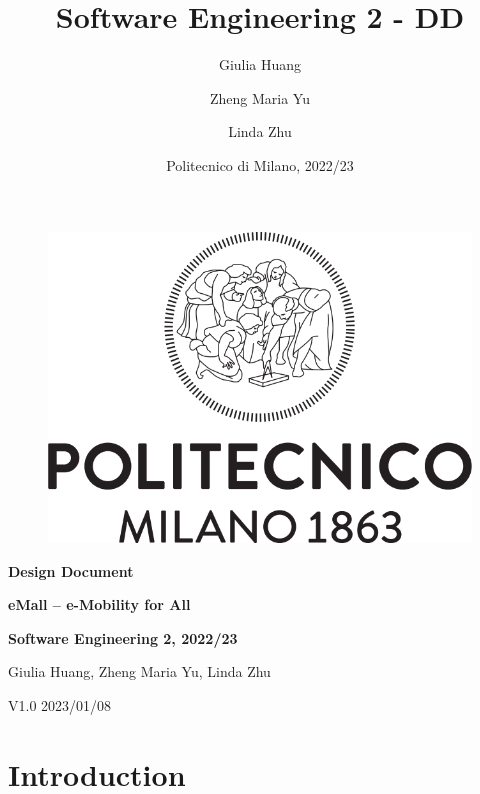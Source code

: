 \documentclass[12pt]{article}
\title{Software Engineering 2 - DD}
\author{
  Giulia Huang
  \and
  Zheng Maria Yu
  \and
  Linda Zhu
}
\date{Politecnico di Milano, 2022/23}
\begin{document}
\begin{titlepage}
\vspace*{2.7cm}
\begin{figure}[h!]
	\centering
	\includegraphics[scale=0.35]{images/logo.png}
\end{figure}
\vspace{0.7em}
\begin{center}
	\Large \textbf{Design Document}
\end{center}
\begin{center}
	\Large \textbf{eMall – e-Mobility for All} 
\end{center}
\vspace{0.7em}
\begin{center}
	\textbf{Software Engineering 2, 2022/23}
\end{center}
\vspace{0.7em}
\begin{center}
	\normalsize Giulia Huang, Zheng Maria Yu, Linda Zhu
\end{center}
\vspace{6em}
\begin{center}
	\normalsize V1.0 2023/01/08
\end{center}
\vspace*{\fill}
\end{titlepage}

\normalsize


\newpage
\tableofcontents

\newpage
\section{Introduction}

\end{document}
